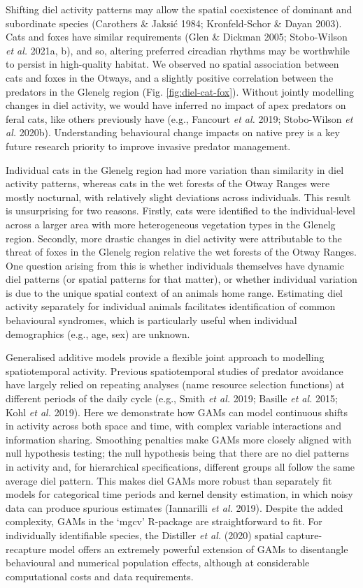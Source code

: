 \documentclass[11pt,a4paper,titlepage,twoside,openright]{style/unimelbthesis}
\begin{document}
\begin{mainmatter}
Shifting diel activity patterns may allow the spatial coexistence of dominant and subordinate species (Carothers \& Jaksić 1984; Kronfeld-Schor \& Dayan 2003). Cats and foxes have similar requirements (Glen \& Dickman 2005; Stobo-Wilson \emph{et al.} 2021a, b), and so, altering preferred circadian rhythms may be worthwhile to persist in high-quality habitat. We observed no spatial association between cats and foxes in the Otways, and a slightly positive correlation between the predators in the Glenelg region (Fig. \ref{fig:diel-cat-fox}). Without jointly modelling changes in diel activity, we would have inferred no impact of apex predators on feral cats, like others previously have (e.g., Fancourt \emph{et al.} 2019; Stobo-Wilson \emph{et al.} 2020b). Understanding behavioural change impacts on native prey is a key future research priority to improve invasive predator management.

Individual cats in the Glenelg region had more variation than similarity in diel activity patterns, whereas cats in the wet forests of the Otway Ranges were mostly nocturnal, with relatively slight deviations across individuals. This result is unsurprising for two reasons. Firstly, cats were identified to the individual-level across a larger area with more heterogeneous vegetation types in the Glenelg region. Secondly, more drastic changes in diel activity were attributable to the threat of foxes in the Glenelg region relative the wet forests of the Otway Ranges. One question arising from this is whether individuals themselves have dynamic diel patterns (or spatial patterns for that matter), or whether individual variation is due to the unique spatial context of an animals home range. Estimating diel activity separately for individual animals facilitates identification of common behavioural syndromes, which is particularly useful when individual demographics (e.g., age, sex) are unknown.

Generalised additive models provide a flexible joint approach to modelling spatiotemporal activity. Previous spatiotemporal studies of predator avoidance have largely relied on repeating analyses (name resource selection functions) at different periods of the daily cycle (e.g., Smith \emph{et al.} 2019; Basille \emph{et al.} 2015; Kohl \emph{et al.} 2019). Here we demonstrate how GAMs can model continuous shifts in activity across both space and time, with complex variable interactions and information sharing. Smoothing penalties make GAMs more closely aligned with null hypothesis testing; the null hypothesis being that there are no diel patterns in activity and, for hierarchical specifications, different groups all follow the same average diel pattern. This makes diel GAMs more robust than separately fit models for categorical time periods and kernel density estimation, in which noisy data can produce spurious estimates (Iannarilli \emph{et al.} 2019). Despite the added complexity, GAMs in the `mgcv' R-package are straightforward to fit. For individually identifiable species, the Distiller \emph{et al.} (2020) spatial capture-recapture model offers an extremely powerful extension of GAMs to disentangle behavioural and numerical population effects, although at considerable computational costs and data requirements.


\end{mainmatter}
\end{document}
